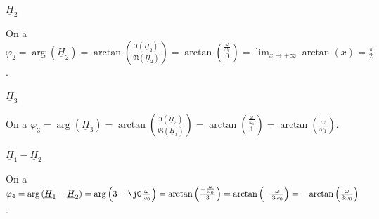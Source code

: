 

\begin{enonce}
	$\underline{H}_2$
\end{enonce}

\begin{corrige}
On a $\varphi_2= \arg\left( \underline{H}_2 \right) =\arctan \left(  \frac{ \Im\left( \underline{H}_2\right) }{ \Re\left( \underline{H}_2\right) } \right) = \arctan \left(  \frac{ \frac{\omega}{\omega_0} }{ 0 } \right) = \lim_{x \rightarrow +\infty} \arctan(x) = \frac{\pi}{2}$.
\end{corrige}



\begin{enonce}
	$\underline{H}_3$
\end{enonce}


\begin{corrige}
On a $\varphi_3= \arg\left( \underline{H}_3 \right) = \arctan \left(  \frac{ \Im\left( \underline{H}_3\right) }{ \Re\left( \underline{H}_3\right) } \right) = \arctan \left(  \frac{ \frac{\omega}{\omega_1} }{ 1 } \right)
	=\arctan \left( \frac{\omega}{\omega_1}  \right)$.
\end{corrige}



\begin{enonce}
	$\underline{H}_1-\underline{H}_2$
\end{enonce}


\begin{corrige}
On a
$\varphi_4= \arg\left( \underline{H}_1-\underline{H}_2 \right)= \arg\left( 3-\jC \frac{\omega}{\omega_0} \right) = \arctan\left(\frac{-\frac{ \omega}{\omega_0} }{ 3 }\right) = \arctan\left(-\frac{\omega}{ 3\omega_0 }\right) = -\arctan\left(\frac{\omega}{ 3\omega_0 }\right)$.
\end{corrige}

